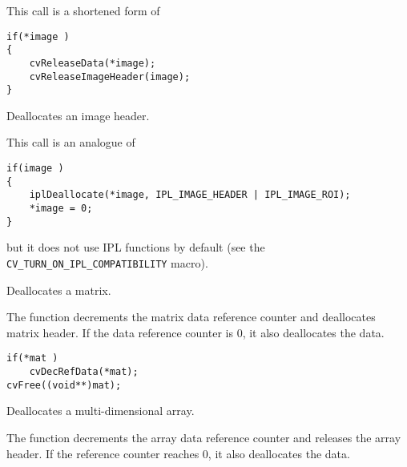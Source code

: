 
\begin{description}
\end{description}

This call is a shortened form of

\begin{lstlisting}
if(*image )
{
    cvReleaseData(*image);
    cvReleaseImageHeader(image);
}
\end{lstlisting}


Deallocates an image header.


\begin{description}
\end{description}

This call is an analogue of
\begin{lstlisting}
if(image )
{
    iplDeallocate(*image, IPL_IMAGE_HEADER | IPL_IMAGE_ROI);
    *image = 0;
}
\end{lstlisting}
but it does not use IPL functions by default (see the \texttt{CV\_TURN\_ON\_IPL\_COMPATIBILITY} macro).


Deallocates a matrix.


\begin{description}
\end{description}


The function decrements the matrix data reference counter and deallocates matrix header. If the data reference counter is 0, it also deallocates the data.

\begin{lstlisting}
if(*mat )
    cvDecRefData(*mat);
cvFree((void**)mat);
\end{lstlisting}


Deallocates a multi-dimensional array.


\begin{description}
\end{description}

The function decrements the array data reference counter and releases the array header. If the reference counter reaches 0, it also deallocates the data.

